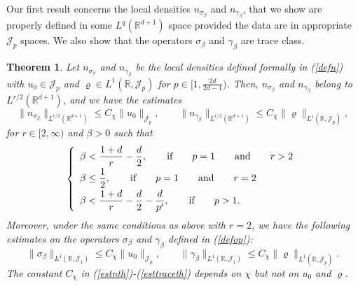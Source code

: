 \documentclass[12pt]{article}
\newtheorem{theorem}{Theorem}[section]
\def \Rm {\mathbb R}
\newcommand{\ds}{\displaystyle}
\newcommand{\Tr}{\textrm{Tr}}
\newcommand{\calJ}{\mathcal J}
\def\fref#1{{\rm (\ref{#1})}}
\newcommand{\be}{\begin{equation}}
\newcommand{\ee}{\end{equation}}
\begin{document}
Our first result concerns the local densities $n_{\sigma_\beta}$ and $n_{\gamma_\beta}$, that we show are properly defined in some $L^q(\Rm^{d+1})$ space provided the data are in appropriate $\calJ_p$ spaces. We also show that the operators $\sigma_\beta$ and $\gamma_\beta$ are trace class. 
\begin{theorem}\label{th1}
Let $n_{\sigma_\beta}$ and $n_{\gamma_\beta}$ be the local densities defined formally in \fref{defn} with $u_0 \in \calJ_p$ and $\varrho \in L^1(\Rm,\calJ_p)$ for $p \in [1,\frac{2d}{2d-1})$. Then, $n_{\sigma_\beta}$ and $n_{\gamma_\beta}$ belong to $L^{r/2}(\Rm^{d+1})$, and we have the estimates
\be \label{estnth}
\|n_{\sigma_\beta}\|_{L^{r/2}(\Rm^{d+1})} \leq C_\chi \|u_0\|_{\calJ_p}, \qquad \|n_{\gamma_\beta}\|_{L^{r/2}(\Rm^{d+1})} \leq C_\chi \|\varrho\|_{L^1(\Rm,\calJ_p)},
\ee
for $r \in [2,\infty)$ and  $\beta >0$ such that 
$$
\left\{
\begin{array}{l} \ds
\ds \beta < \frac{1+d}{r}-\frac{d}{2}, \qquad \textrm{if} \qquad p=1 \qquad \textrm{and} \qquad r>2\\[2mm]
\ds \beta \leq \frac{1}{2}, \qquad \textrm{if} \qquad p=1 \qquad \textrm{and} \qquad r=2\\[2mm]
\ds \beta < \frac{1+d}{r}-\frac{d}{2}-\frac{d}{p'}, \qquad \textrm{if} \qquad  p>1.
\end{array}
\right.
$$
Moreover, under the same conditions as above with $r=2$, we have the following estimates on the operators $\sigma_\beta$ and $\gamma_\beta$ defined in \fref{defop}:
\be \label{esttraceth}
\|\sigma_\beta\|_{L^1(\Rm,\calJ_1)} \leq C_\chi \|u_0\|_{\calJ_p}, \qquad \|\gamma_\beta\|_{L^1(\Rm,\calJ_1)} \leq C_\chi \|\varrho\|_{L^1(\Rm,\calJ_p)}.
\ee
The constant $C_\chi$ in \fref{estnth}-\fref{esttraceth} depends on $\chi$ but not on $u_0$ and $\varrho$.
\end{theorem}
\end{document}
